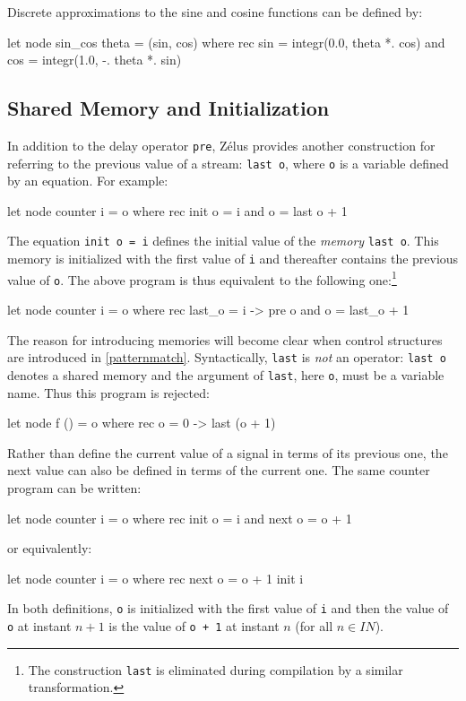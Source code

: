 \documentclass[11pt,titlepage,twoside]{report}
\makeatletter
\newcommand{\zls}[1]{{\@span{class="zelusinline"}#1}}
\newcommand{\zls}[1]{\texttt{#1}}
\renewcommand{\zls}[1]{\texttt{#1}}
\newcommand{\zelus}{{\sf Z\'elus}}
\newcommand{\Nat}{I\!\!N}
\makeatother
\begin{document}
\noindent Discrete approximations to the sine and cosine functions can be 
defined by:
\begin{chklisting}[continue,include=integr]
let node sin_cos theta = (sin, cos) where
  rec sin = integr(0.0, theta *. cos)
  and cos = integr(1.0, -. theta *. sin)
\end{chklisting}

\subsection{Shared Memory and Initialization\label{sharedinit}} %

In addition to the delay operator \zls{pre}, \zelus{} provides another 
construction for referring to the previous value of a stream: \zls{last o}, 
where \zls{o} is a variable defined by an equation. For example:%
\begin{chklisting}
let node counter i = o where
  rec init o = i
  and o = last o + 1
\end{chklisting}
The equation \zls{init o = i} defines the initial value of the \emph{memory} 
\zls{last o}. This memory is initialized with the first
value of \zls{i} and thereafter contains the previous value of
\zls{o}. The above program is thus equivalent to the following
one:\footnote{The construction \zls{last} is eliminated during compilation 
by a similar transformation.}
\begin{chklisting}
let node counter i = o where
  rec last_o = i -> pre o
  and o = last_o + 1
\end{chklisting}
The reason for introducing memories will become clear when control 
structures are introduced in \cref{patternmatch}.
Syntactically, \zls{last} is {\em not} an operator: \zls{last o} denotes
a shared memory and the argument of \zls{last}, here \zls{o}, must be a 
variable name. Thus this program is rejected:
\begin{chklisting}
let node f () = o where
  rec o = 0 -> last (o + 1)
\end{chklisting}

Rather than define the current value of a signal in terms of its previous
one, the next value can also be defined in terms of the current one.
The same counter program can be written:
\begin{chklisting}
let node counter i = o where
  rec init o = i
  and next o = o + 1
\end{chklisting}
or equivalently:
\begin{chklisting}
let node counter i = o where
  rec next o = o + 1 init i
\end{chklisting}
In both definitions, \zls{o} is initialized with the first value of
\zls{i} and then the value of \zls{o} at instant $n+1$ is the value of
\zls{o + 1} at instant $n$ (for all $n \in \Nat$).
\end{document}
